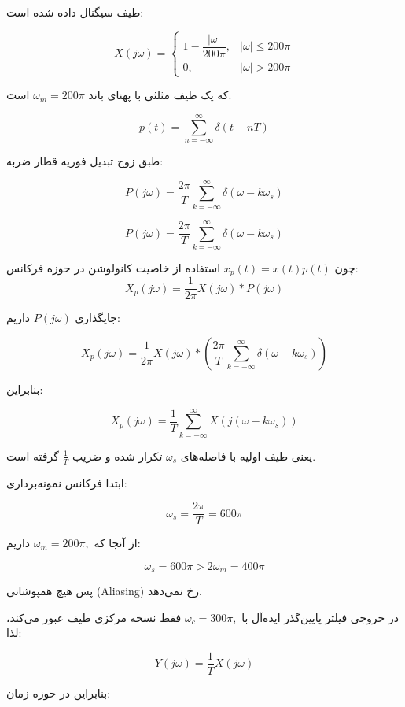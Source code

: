 
طیف سیگنال داده شده است:

\[
X(j\omega)=
\begin{cases}
1-\dfrac{|\omega|}{200\pi}, & |\omega|\le 200\pi\\[2mm]
0, & |\omega|>200\pi
\end{cases}
\]

که یک طیف مثلثی با پهنای باند
\(
\omega_m=200\pi
\)
است.




\[
p(t)=\sum_{n=-\infty}^{\infty}\delta(t-nT)
\]

طبق زوج تبدیل فوریه قطار ضربه:

\[
P(j\omega)
=
\frac{2\pi}{T}
\sum_{k=-\infty}^{\infty}
\delta(\omega-k\omega_s)
\]

\[
{
P(j\omega)=
\frac{2\pi}{T}
\sum_{k=-\infty}^{\infty}
\delta(\omega-k\omega_s)
}
\]



چون
\(
x_p(t)=x(t)p(t)
\)
استفاده از خاصیت کانولوشن در حوزه فرکانس:
\[
X_p(j\omega) = \frac{1}{2\pi} X(j\omega) * P(j\omega)
\]

جایگذاری \(P(j\omega)\) داریم:

\[
X_p(j\omega)
=
\frac{1}{2\pi}
X(j\omega)
*
\left(
\frac{2\pi}{T}
\sum_{k=-\infty}^{\infty}
\delta(\omega-k\omega_s)
\right)
\]

بنابراین:

\[
{
X_p(j\omega)
=
\frac{1}{T}
\sum_{k=-\infty}^{\infty}
X\!\left(j(\omega-k\omega_s)\right)
}
\]

یعنی طیف اولیه با فاصله‌های $\omega_s$ تکرار شده و ضریب
$\frac1T$
گرفته است.



ابتدا فرکانس نمونه‌برداری:

\[
\omega_s
=
\frac{2\pi}{T}
=
600\pi
\]

از آنجا که
\(
\omega_m=200\pi,
\)
داریم:

\[
\omega_s=600\pi >2\omega_m=400\pi
\]

پس هیچ همپوشانی (Aliasing) رخ نمی‌دهد.

در خروجی فیلتر پایین‌گذر ایده‌آل با
\(
\omega_c=300\pi,
\)
فقط نسخه مرکزی طیف عبور می‌کند، لذا:

\[
Y(j\omega)
=
\frac1T X(j\omega)
\]

بنابراین در حوزه زمان:

